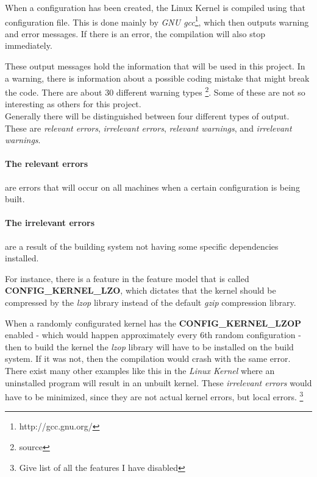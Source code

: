 \documentclass[a4paper,11pt]{article}
\begin{document}
When a configuration has been created, the Linux Kernel is compiled using 
that configuration file. This is done mainly by \emph{GNU 
gcc}\footnote{http://gcc.gnu.org/}, which then outputs warning and error 
messages. If there is an error, the compilation will also stop immediately.

These output messages hold the information that will be used in this project. 
In a warning, there is information about a possible coding mistake that might 
break the code. There are about 30 different warning types \footnote{source}. 
Some of these are not so interesting as others for this project.\\


Generally there will be distinguished between four different types of output. 
These are \emph{relevant errors}, \emph{irrelevant errors}, \emph{relevant 
warnings}, and \emph{irrelevant warnings}. 


\paragraph{The relevant errors} are errors that will occur on all machines 
when a certain configuration is being built. 


\paragraph{The irrelevant errors} 
are a result of the building system not having some specific dependencies 
installed. 

For instance, there is a feature in the feature model that is called 
\textbf{CONFIG\_KERNEL\_LZO}, which dictates that the kernel should be 
compressed by the \emph{lzop} library instead of the default \emph{gzip} 
compression library.

When a randomly configurated kernel has the \textbf{CONFIG\_KERNEL\_LZOP} 
enabled - which would happen approximately every 6th random configuration - 
then to build the kernel the \emph{lzop} library will have to be installed on 
the build system. If it was not, then the compilation would crash with the 
same error. \\ 


There exist many other examples like this in the \emph{Linux Kernel} where an 
uninstalled program will result in an unbuilt kernel. These \emph{irrelevant 
errors} would have to be minimized, since they are not actual kernel errors, 
but local errors. \footnote{Give list of all the features I have disabled}
\end{document}
